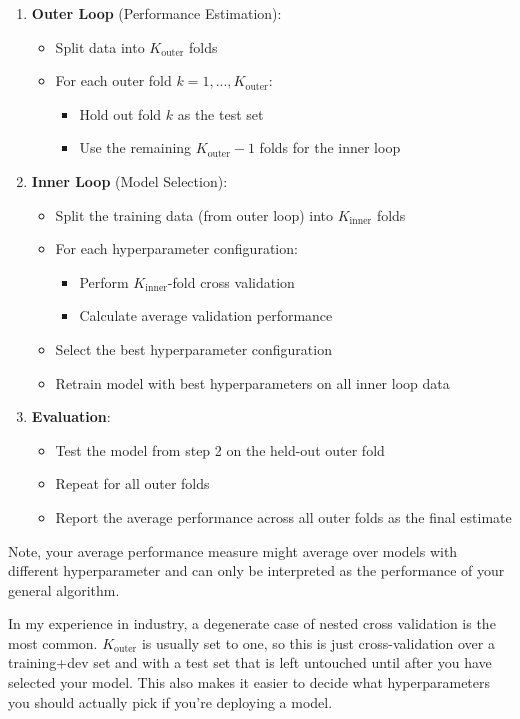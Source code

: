 \begin{enumerate}
\item \textbf{Outer Loop} (Performance Estimation):
   \begin{itemize}
   \item Split data into $K_{\mathrm{outer}}$ folds
   \item For each outer fold $k = 1, ..., K_{\mathrm{outer}}$:
     \begin{itemize}
     \item Hold out fold $k$ as the test set
     \item Use the remaining $K_{\mathrm{outer}} - 1$ folds for the inner loop
     \end{itemize}
   \end{itemize}

\item \textbf{Inner Loop} (Model Selection):
   \begin{itemize}
   \item Split the training data (from outer loop) into $K_{\mathrm{inner}}$ folds
   \item For each hyperparameter configuration:
     \begin{itemize}
     \item Perform $K_{\mathrm{inner}}$-fold cross validation
     \item Calculate average validation performance
     \end{itemize}
   \item Select the best hyperparameter configuration
   \item Retrain model with best hyperparameters on all inner loop data
   \end{itemize}

\item \textbf{Evaluation}:
   \begin{itemize}
   \item Test the model from step 2 on the held-out outer fold
   \item Repeat for all outer folds
   \item Report the average performance across all outer folds as the final estimate
   \end{itemize}
\end{enumerate}

Note, your average performance measure might average over models with different hyperparameter and can only be interpreted as the performance of your general algorithm.

In my experience in industry, a degenerate case of nested cross validation is the most common. $K_{\mathrm{outer}}$ is usually set to one, so this is just cross-validation over a training+dev set and with a test set that is left untouched until after you have selected your model. This also makes it easier to decide what hyperparameters you should actually pick if you're deploying a model.

